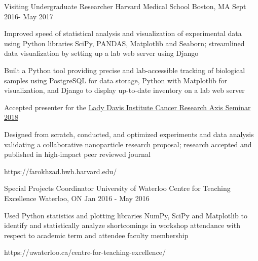 \begin{cventries}
\vspace{1mm}


\cventrylink
{Visiting Undergraduate Researcher}
{Harvard Medical School}
{Boston, MA}
{Sept 2016- May 2017}
{ %
\begin{cvitems}
\item{Improved speed of statistical analysis and visualization of experimental data using Python libraries  \textcolor{awesome-skyblue}{SciPy, PANDAS, \newline Matplotlib} and  \textcolor{awesome-skyblue}{Seaborn}; streamlined data visualization by setting up a lab web server using  \textcolor{awesome-skyblue}{Django}}
\item{Built a Python tool providing precise and lab-accessible tracking of biological samples using  \textcolor{awesome-skyblue}{PostgreSQL} for data \newline storage, Python with Matplotlib for visualization, and Django to display up-to-date inventory on a lab web server}
\item{Accepted presenter for the \href{http://www.ladydavis.ca/en/en/newcalendar?eventid=61&edate=2018-01-12}{Lady Davis Institute Cancer Research Axis Seminar 2018} }
\item{Designed from scratch, conducted, and optimized experiments and data analysis validating a collaborative nanoparticle research proposal; research accepted and published in high-impact peer reviewed journal}
\end{cvitems}
}
{https://farokhzad.bwh.harvard.edu/}
 \vspace{1mm}
 
\cventrylink
{Special Projects Coordinator}
{University of Waterloo Centre for Teaching Excellence}
{Waterloo, ON}
{Jan 2016 - May 2016}
{ %
\begin{cvitems}
\item {Used Python statistics and plotting libraries  \textcolor{awesome-skyblue}{NumPy, SciPy} and  \textcolor{awesome-skyblue}{Matplotlib} to identify and statistically analyze \newline shortcomings in workshop attendance with respect to academic term and attendee faculty membership}
\end{cvitems}
}
{https://uwaterloo.ca/centre-for-teaching-excellence/}

\end{cventries}


    